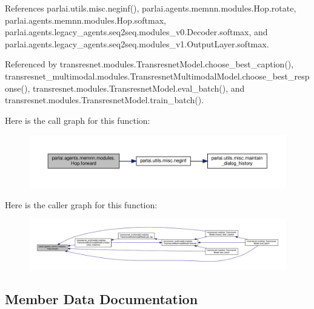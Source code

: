 References parlai.\+utils.\+misc.\+neginf(), parlai.\+agents.\+memnn.\+modules.\+Hop.\+rotate, parlai.\+agents.\+memnn.\+modules.\+Hop.\+softmax, parlai.\+agents.\+legacy\+\_\+agents.\+seq2seq.\+modules\+\_\+v0.\+Decoder.\+softmax, and parlai.\+agents.\+legacy\+\_\+agents.\+seq2seq.\+modules\+\_\+v1.\+Output\+Layer.\+softmax.



Referenced by transresnet.\+modules.\+Transresnet\+Model.\+choose\+\_\+best\+\_\+caption(), transresnet\+\_\+multimodal.\+modules.\+Transresnet\+Multimodal\+Model.\+choose\+\_\+best\+\_\+response(), transresnet.\+modules.\+Transresnet\+Model.\+eval\+\_\+batch(), and transresnet.\+modules.\+Transresnet\+Model.\+train\+\_\+batch().

Here is the call graph for this function\+:
\nopagebreak
\begin{figure}[H]
\begin{center}
\leavevmode
\includegraphics[width=350pt]{classparlai_1_1agents_1_1memnn_1_1modules_1_1Hop_ad4e6c91364efc31ac3f0239d7a7c1376_cgraph}
\end{center}
\end{figure}
Here is the caller graph for this function\+:
\nopagebreak
\begin{figure}[H]
\begin{center}
\leavevmode
\includegraphics[width=350pt]{classparlai_1_1agents_1_1memnn_1_1modules_1_1Hop_ad4e6c91364efc31ac3f0239d7a7c1376_icgraph}
\end{center}
\end{figure}


\subsection{Member Data Documentation}
\mbox{\label{classparlai_1_1agents_1_1memnn_1_1modules_1_1Hop_a88857c10815bc48ef24c78ecf367935d}} 
